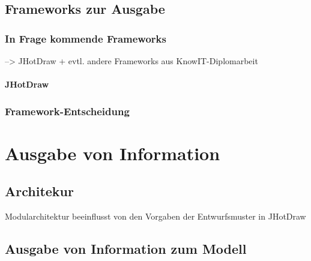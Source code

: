 \subsection{Frameworks zur Ausgabe} %
\label{sub:frameworks_zur_ausgabe}

\subsubsection{In Frage kommende Frameworks} %
\label{ssub:in_frage_kommende_frameworks}

--> JHotDraw + evtl. andere Frameworks aus KnowIT-Diplomarbeit

\paragraph{JHotDraw} %
\label{par:jhotdraw}


\subsubsection{Framework-Entscheidung} %
\label{ssub:output:framework_entscheidung}





\section{Ausgabe von Information} %
\label{sec:ausgabe_von_information}

\subsection{Architekur} %
\label{sub:architekur}

Modularchitektur beeinflusst von den Vorgaben der Entwurfsmuster in JHotDraw

\subsection{Ausgabe von Information zum Modell} %
\label{sub:ausgabe_von_information_zum_modell}

